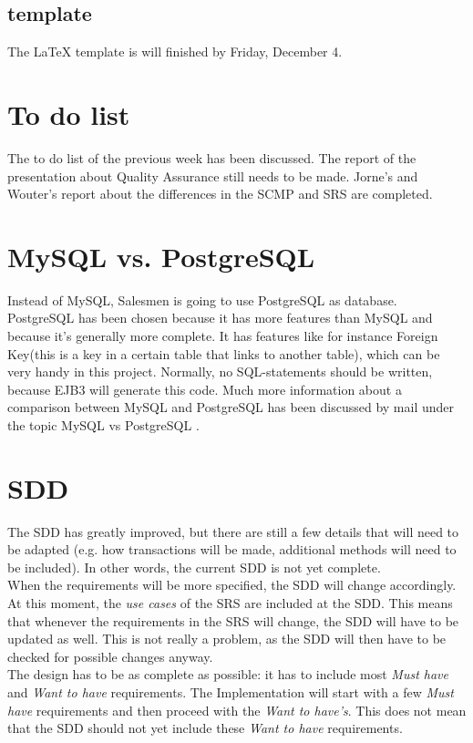 \documentclass[a4paper, 12pt]{article}
\begin{document}
		\subsection{template}
The \LaTeX{} template is will finished by Friday, December 4.
	\section{To do list}
The to do list of the previous week has been discussed. The report of the presentation about Quality Assurance still needs to be made. Jorne's and Wouter's report about the differences in the SCMP and SRS are completed.

	\section{MySQL vs. PostgreSQL}
Instead of MySQL, Salesmen is going to use PostgreSQL as database. PostgreSQL has been chosen because it has more features than MySQL and because it's generally more complete. It has features like for instance Foreign Key(this is a key in a certain table that links to another table), which can be very handy in this project. Normally, no SQL-statements should be written, because EJB3 will generate this code.
Much more information about a comparison between MySQL and PostgreSQL has been discussed by mail under the topic MySQL vs PostgreSQL \cite{site1}.

	\section{SDD}
The SDD has greatly improved, but there are still a few details that will need to be adapted (e.g. how transactions will be made, additional methods will need to be included). In other words, the current SDD is not yet complete. \\
When the requirements will be more specified, the SDD will change accordingly. At this moment, the \textit{use cases} of the SRS are included at the SDD. This means that whenever the requirements in the SRS will change, the SDD will have to be updated as well. This is not really a problem, as the SDD will then have to be checked for possible changes anyway.\\
The design has to be as complete as possible: it has to include most \textit{Must have} and \textit{Want to have} requirements. The Implementation will start with a few \textit{Must have} requirements and then proceed with the \textit{Want to have's}. This does not mean that the SDD should not yet include these \textit{Want to have} requirements.\\
\end{document}
